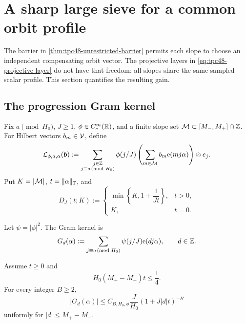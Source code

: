 \section{A sharp large sieve for a common orbit profile}
\label{sec:tpc48-large-sieve}

The barrier in \cref{thm:tpc48-unrestricted-barrier} permits each slope
to choose an independent compensating orbit vector.  The projective
layers in \eqref{eq:tpc48-projective-layer} do not have that freedom:
all slopes share the same sampled scalar profile.  This section
quantifies the resulting gain.

\subsection{The progression Gram kernel}

Fix \(a\pmod{H_0}\), \(J\ge1\),
\(\phi\in C_c^\infty(\mathbb R)\), and a finite slope set
\(\mathcal M\subset[M_-,M_+]\cap\mathbb Z\).  For Hilbert vectors
\(b_m\in\mathcal V\), define
\begin{equation}
 \mathcal L_{\phi,a,\alpha}(\bm b)
 :=\sum_{\substack{j\in\mathbb Z\\j\equiv a\!\!\pmod{H_0}}}
 \phi(j/J)
 \left(\sum_{m\in\mathcal M}b_m\mathrm e(mj\alpha)\right)\otimes e_j.
 \label{eq:tpc48-common-profile-operator}
\end{equation}
Put \(K=|\mathcal M|\), \(t=\|\alpha\|_\mathbb T\), and
\begin{equation}
 D_J(t;K):=
 \begin{cases}
  \min\left\{K,1+\dfrac1{Jt}\right\},&t>0,\\[4pt]
  K,&t=0.
 \end{cases}
 \label{eq:tpc48-collision-factor}
\end{equation}

Let \(\psi=|\phi|^2\).  The Gram kernel is
\begin{equation}
 G_d(\alpha)
 :=\sum_{j\equiv a\!\!\pmod{H_0}}
 \psi(j/J)\mathrm e(dj\alpha),
 \qquad d\in\mathbb Z.
 \label{eq:tpc48-Gram-kernel}
\end{equation}

\begin{lemma}
\label{lem:tpc48-Gram-decay}
Assume \(t\ge0\) and
\begin{equation}
 H_0(M_+-M_-)t\le\frac14.
 \label{eq:tpc48-large-sieve-no-wrap}
\end{equation}
For every integer \(B\ge2\),
\begin{equation}
 |G_d(\alpha)|
 \le C_{B,H_0,\phi}\frac{J}{H_0}
 (1+J|d|t)^{-B}
 \label{eq:tpc48-Gram-decay}
\end{equation}
uniformly for \(|d|\le M_+-M_-\).
\end{lemma}

